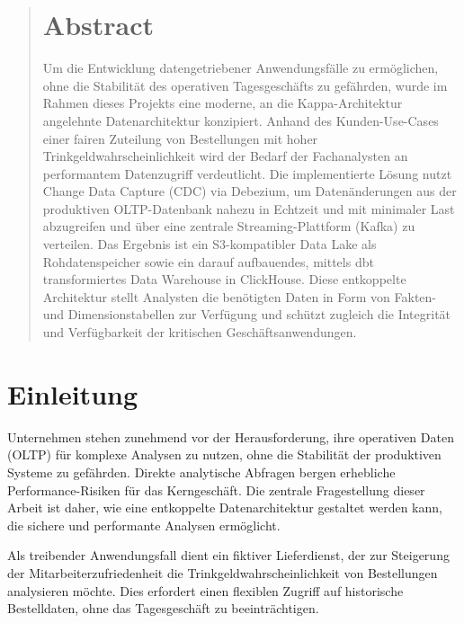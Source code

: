 \documentclass[
    12pt,               
    a4paper,        
    ngerman            
]{scrartcl}
\begin{document}
\begin{abstract}
    \noindent
    \section*{Abstract}
    Um die Entwicklung datengetriebener Anwendungsfälle zu ermöglichen, ohne die Stabilität des operativen Tagesgeschäfts zu gefährden, wurde im Rahmen dieses Projekts eine moderne, an die Kappa-Architektur angelehnte Datenarchitektur konzipiert. Anhand des Kunden-Use-Cases einer fairen Zuteilung von Bestellungen mit hoher Trinkgeldwahrscheinlichkeit wird der Bedarf der Fachanalysten an performantem Datenzugriff verdeutlicht. Die implementierte Lösung nutzt Change Data Capture (CDC) via Debezium, um Datenänderungen aus der produktiven OLTP-Datenbank nahezu in Echtzeit und mit minimaler Last abzugreifen und über eine zentrale Streaming-Plattform (Kafka) zu verteilen. Das Ergebnis ist ein S3-kompatibler Data Lake als Rohdatenspeicher sowie ein darauf aufbauendes, mittels dbt transformiertes Data Warehouse in ClickHouse. Diese entkoppelte Architektur stellt Analysten die benötigten Daten in Form von Fakten- und Dimensionstabellen zur Verfügung und schützt zugleich die Integrität und Verfügbarkeit der kritischen Geschäftsanwendungen.
\end{abstract}


\newpage 
\tableofcontents
\newpage


\section{Einleitung}
Unternehmen stehen zunehmend vor der Herausforderung, ihre operativen Daten (OLTP) für komplexe Analysen zu nutzen, ohne die Stabilität der produktiven Systeme zu gefährden. Direkte analytische Abfragen bergen erhebliche Performance-Risiken für das Kerngeschäft. Die zentrale Fragestellung dieser Arbeit ist daher, wie eine entkoppelte Datenarchitektur gestaltet werden kann, die sichere und performante Analysen ermöglicht.

Als treibender Anwendungsfall dient ein fiktiver Lieferdienst, der zur Steigerung der Mitarbeiterzufriedenheit die Trinkgeldwahrscheinlichkeit von Bestellungen analysieren möchte. Dies erfordert einen flexiblen Zugriff auf historische Bestelldaten, ohne das Tagesgeschäft zu beeinträchtigen.
\end{document}

